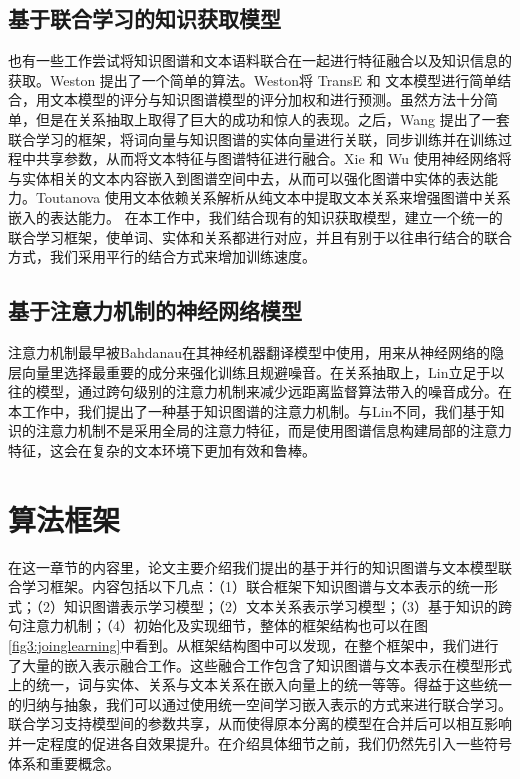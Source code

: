 \subsection{基于联合学习的知识获取模型}

也有一些工作尝试将知识图谱和文本语料联合在一起进行特征融合以及知识信息的获取。Weston \cite{weston2013connecting}提出了一个简单的算法。Weston将 TransE 和 文本模型进行简单结合，用文本模型的评分与知识图谱模型的评分加权和进行预测。虽然方法十分简单，但是在关系抽取上取得了巨大的成功和惊人的表现。之后，Wang \cite{wang2014knowledge} 提出了一套联合学习的框架，将词向量与知识图谱的实体向量进行关联，同步训练并在训练过程中共享参数，从而将文本特征与图谱特征进行融合。Xie \cite{xie2016representation}和 Wu \cite{wu2016knowledge} 使用神经网络将与实体相关的文本内容嵌入到图谱空间中去，从而可以强化图谱中实体的表达能力。Toutanova \cite{toutanova2015representing}使用文本依赖关系解析从纯文本中提取文本关系来增强图谱中关系嵌入的表达能力。 
在本工作中，我们结合现有的知识获取模型，建立一个统一的联合学习框架，使单词、实体和关系都进行对应，并且有别于以往串行结合的联合方式，我们采用平行的结合方式来增加训练速度。


\subsection{基于注意力机制的神经网络模型} 

注意力机制最早被Bahdanau\cite{bahdanau2014neural}在其神经机器翻译模型中使用，用来从神经网络的隐层向量里选择最重要的成分来强化训练且规避噪音。在关系抽取上，Lin\cite{lin2016neural}立足于以往的模型，通过跨句级别的注意力机制来减少远距离监督算法带入的噪音成分。在本工作中，我们提出了一种基于知识图谱的注意力机制。与Lin\cite{lin2016neural}不同，我们基于知识的注意力机制不是采用全局的注意力特征，而是使用图谱信息构建局部的注意力特征，这会在复杂的文本环境下更加有效和鲁棒。

\section{算法框架}
在这一章节的内容里，论文主要介绍我们提出的基于并行的知识图谱与文本模型联合学习框架。内容包括以下几点：（1）联合框架下知识图谱与文本表示的统一形式；（2）知识图谱表示学习模型；（2）文本关系表示学习模型；（3）基于知识的跨句注意力机制；（4）初始化及实现细节，整体的框架结构也可以在图\ref{fig3:joinglearning}中看到。从框架结构图中可以发现，在整个框架中，我们进行了大量的嵌入表示融合工作。这些融合工作包含了知识图谱与文本表示在模型形式上的统一，词与实体、关系与文本关系在嵌入向量上的统一等等。得益于这些统一的归纳与抽象，我们可以通过使用统一空间学习嵌入表示的方式来进行联合学习。联合学习支持模型间的参数共享，从而使得原本分离的模型在合并后可以相互影响并一定程度的促进各自效果提升。在介绍具体细节之前，我们仍然先引入一些符号体系和重要概念。

